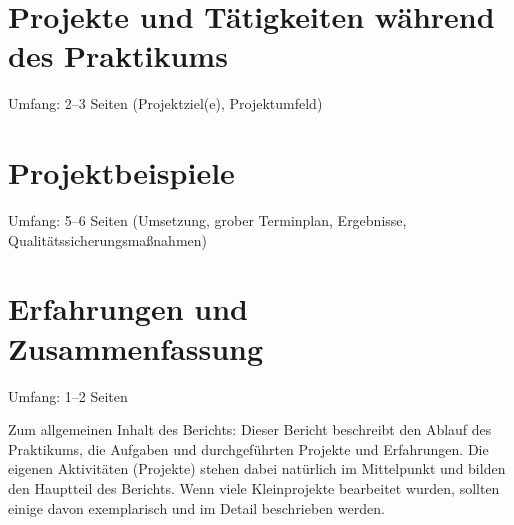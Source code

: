 \documentclass[praktikum,german]{hgbthesis}
\begin{document}
\chapter{Projekte und Tätigkeiten während des Praktikums}
Umfang: 2--3 Seiten (Projektziel(e), Projektumfeld)
      
\chapter{Projektbeispiele}
Umfang: 5--6 Seiten (Umsetzung, grober Terminplan, Ergebnisse, Qualitätssicherungsmaßnahmen)
   
   
\chapter{Erfahrungen und Zusammenfassung}
Umfang: 1--2 Seiten

Zum allgemeinen Inhalt des Berichts: Dieser Bericht beschreibt den Ablauf des Praktikums, die Aufgaben und durchgeführten Projekte und Erfahrungen. Die eigenen Aktivitäten (Projekte) stehen dabei natürlich im Mittelpunkt und bilden den Hauptteil des Berichts. Wenn viele Kleinprojekte bearbeitet wurden, sollten einige davon exemplarisch und im Detail beschrieben werden.


%
\end{document}

